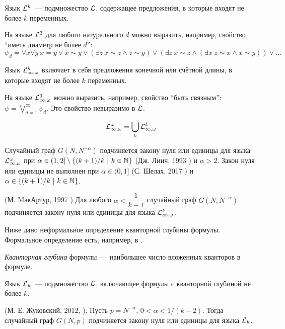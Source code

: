 \Def Язык $\mathcal{L}^k$~--- подмножество $\mathcal{L}$, содержащее предложения, в которые входят не более $k$ переменных.

На языке $\mathcal{L}^3$ для любого натурального $d$ можно выразить, например, свойство ``иметь диаметр не более $d$'': 
\[
\psi_d = \forall x \forall y ~ x = y \vee x \sim y \vee \left( \exists z ~ x\sim z \wedge z \sim y \right)
\vee  \left( \exists z ~ x\sim z \wedge \left( \exists x ~ z \sim x \wedge x \sim y \right) \right) \vee \ldots
\]

\Def Язык $\mathcal{L}^k_{\infty, \omega}$ включает в себя предложения конечной или счётной длины, в которые входят не более $k$ переменных.

На языке $\mathcal{L}^3_{\infty, \omega}$ можно выразить, например, свойство ``быть связным'': $\psi = \bigvee_{d=1}^\infty \psi_d$.
Это свойство невыразимо в $\mathcal{L}$.

\Def \[\mathcal{L}^\omega_{\infty, \omega} = \bigcup_k \mathcal{L}^k_{\infty, \omega} \]

\begin{theorem}
Случайный граф $G(N, N^{-\alpha})$ подчиняется закону нуля или единицы для языка $\mathcal{L}^\omega_{\infty, \omega}$ при $\alpha \in (1,2] \setminus \{(k+1)/k ~|~ k \in \mathbb {N} \}$ (Дж. Линч, 1993  \cite{lynch1993infinitary}) и $\alpha > 2$.
Закон нуля или единицы не выполнен при $\alpha \in (0,1]$ (С. Шелах, 2017 \cite{shelah2017failure})  и $\alpha \in \{(k+1)/k ~|~ k \in \mathbb {N} \}$.
\end{theorem}

\begin{theorem} (М. MакАртур, 1997 \cite{mcarthur1997asymptotic})
Для любого $\alpha < \dfrac{1}{k-1}$ случайный граф $G(N, N^{-\alpha})$ подчиняется закону нуля или единицы для языка $\mathcal{L}^k_{\infty, \omega}$.
\end{theorem}

Ниже дано неформальное определение кванторной глубины формулы.
Формальное определение есть, например, в \cite{shen}.

\Def \textit{Кванторная глубина} формулы~--- наибольшее число вложенных кванторов в формуле.

\Def Язык $\mathcal{L}_k$~--- подмножество $\mathcal{L}$, включающее формулы с кванторной глубиной не более $k$.

\begin{theorem}(М. Е. Жуковский, 2012, \cite{zhukovskii2012zero}). Пусть $p=N^{-\alpha}$, $0 < \alpha < 1/(k - 2)$. 
Тогда случайный граф $G(N, p)$ подчиняется закону нуля или единицы для языка $\mathcal{L}_k$.
\end{theorem}